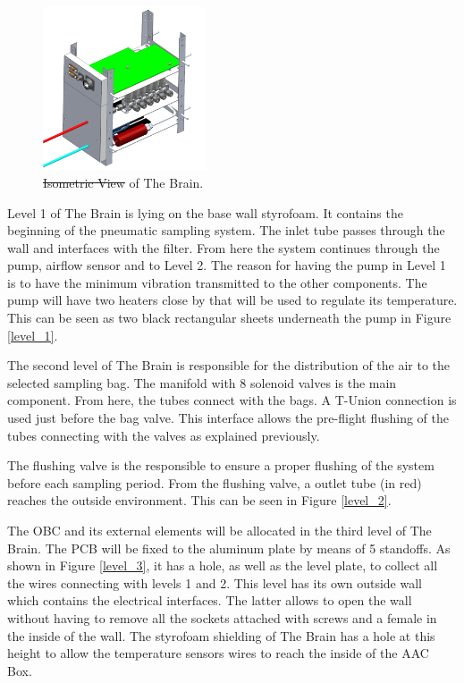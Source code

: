 \documentclass[a4paper,12pt,twoside]{article}
\providecommand{\DIFaddtex}[1]{{\protect\color{blue}\uwave{#1}}} %
\providecommand{\DIFdeltex}[1]{{\protect\color{red}\sout{#1}}}                      %
\providecommand{\DIFaddFL}[1]{\DIFadd{#1}} %
\providecommand{\DIFdelFL}[1]{\DIFdel{#1}} %
\providecommand{\DIFaddbeginFL}{} %
\providecommand{\DIFaddendFL}{} %
\providecommand{\DIFdelbeginFL}{} %
\providecommand{\DIFdelendFL}{} %
\providecommand{\DIFadd}[1]{\texorpdfstring{\DIFaddtex{#1}}{#1}} %
\providecommand{\DIFdel}[1]{\texorpdfstring{\DIFdeltex{#1}}{}} %
\newcommand{\DIFscaledelfig}{0.5}
\newlength{\DIFdelgraphicswidth} %
\newlength{\DIFdelgraphicsheight} %
\newcommand{\DIFaddincludegraphics}[2][]{{\color{blue}\fbox{\DIFOincludegraphics[#1]{#2}}}} %
\newcommand{\DIFdelincludegraphics}[2][]{%
\sbox{\DIFdelgraphicsbox}{\DIFOincludegraphics[#1]{#2}}%
\settoboxwidth{\DIFdelgraphicswidth}{\DIFdelgraphicsbox} %
\settoboxtotalheight{\DIFdelgraphicsheight}{\DIFdelgraphicsbox} %
\scalebox{\DIFscaledelfig}{%
\parbox[b]{\DIFdelgraphicswidth}{\usebox{\DIFdelgraphicsbox}\\[-\baselineskip] \rule{\DIFdelgraphicswidth}{0em}}\llap{\resizebox{\DIFdelgraphicswidth}{\DIFdelgraphicsheight}{%
\setlength{\unitlength}{\DIFdelgraphicswidth}%
\begin{picture}(1,1)%
\thicklines\linethickness{2pt} %
{\color[rgb]{1,0,0}\put(0,0){\framebox(1,1){}}}%
{\color[rgb]{1,0,0}\put(0,0){\line( 1,1){1}}}%
{\color[rgb]{1,0,0}\put(0,1){\line(1,-1){1}}}%
\end{picture}%
}\hspace*{3pt}}} %
} %
\DeclareRobustCommand{\DIFaddbeginFL}{\DIFOaddbeginFL \let\includegraphics\DIFaddincludegraphics} %
\DeclareRobustCommand{\DIFaddendFL}{\DIFOaddendFL \let\includegraphics\DIFOincludegraphics} %
\DeclareRobustCommand{\DIFdelbeginFL}{\DIFOdelbeginFL \let\includegraphics\DIFdelincludegraphics} %
\DeclareRobustCommand{\DIFdelendFL}{\DIFOaddendFL \let\includegraphics\DIFOincludegraphics} %
\begin{document}
\begin{figure}[H]
    \centering
    \includegraphics[width=0.43\textwidth]{4-experiment-design/img/Mechanical/The_Brain_Isometric.png}
    \caption{\DIFdelbeginFL \DIFdelFL{Isometric View }\DIFdelendFL \DIFaddbeginFL \DIFaddFL{Inside view }\DIFaddendFL of The Brain.}
    \label{brain_isometric_open}
\end{figure}
Level 1 of The Brain is lying on the base wall styrofoam. It contains the beginning of the pneumatic sampling system. The inlet tube passes through the wall and interfaces with the filter. From here the system continues through the pump, airflow sensor and to Level 2. The reason for having the pump in Level 1 is to have the minimum vibration transmitted to the other components. The pump will have two heaters close by that will be used to regulate its temperature. This can be seen as two black rectangular sheets underneath the pump in Figure \ref{level_1}.

The second level of The Brain is responsible for the distribution of the air to the selected sampling bag. The manifold with 8 solenoid valves is the main component. From here, the tubes connect with the bags. A T-Union connection is used just before the bag valve. This interface allows the pre-flight flushing of the tubes connecting with the valves as explained previously. 

\smallskip
The flushing valve is the responsible to ensure a proper flushing of the system before each sampling period. From the flushing valve, a outlet tube (in red) reaches the outside environment. This can be seen in Figure \ref{level_2}.

The OBC and its external elements will be allocated in the third level of The Brain. The PCB will be fixed to the aluminum plate by means of 5 standoffs. As shown in Figure \ref{level_3}, it has a hole, as well as the level plate, to collect all the wires connecting with levels 1 and 2. This level has its own outside wall which contains the electrical interfaces. The latter allows to open the wall without having to remove all the sockets attached with screws and a female in the inside of the wall. The styrofoam shielding of The Brain has a hole at this height to allow the temperature sensors wires to reach the inside of the AAC Box. 
\end{document}

